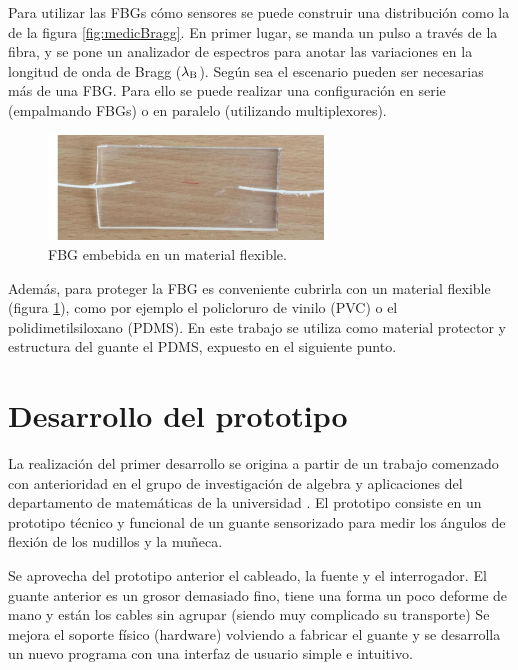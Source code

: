 \begin{itemize}
		Para utilizar las FBGs cómo sensores se puede construir una distribución como la de la figura \ref{fig:medicBragg}. En primer lugar, se manda un pulso a través de la fibra, y se pone un analizador de espectros para anotar las variaciones en la longitud de onda de Bragg ($\lambda\textsubscript{B}$). Según sea el escenario pueden ser necesarias más de una FBG. Para ello se puede realizar una configuración en serie (empalmando FBGs) o en paralelo (utilizando multiplexores). 
		
		\begin{figure}[H]
			\centering
			\includegraphics[width=0.65\textwidth]{./img/flexibleFBG}
			\caption{FBG embebida en un material flexible. \cite{nedomaPDMS}} 
			\label{fig:flexibleFBG}
		\end{figure}
	
		Además, para proteger la FBG es conveniente cubrirla con un material flexible (figura \ref{fig:flexibleFBG}), como por ejemplo el policloruro de vinilo (PVC) o el polidimetilsiloxano (PDMS). En este trabajo se utiliza como material protector y estructura del guante el PDMS, expuesto en el siguiente punto.
	
\end{itemize}


\section{Desarrollo del prototipo}
\label{sec:prototipo3}

La realización del primer desarrollo se origina a partir de un trabajo comenzado con anterioridad en el grupo de investigación de algebra y aplicaciones del departamento de matemáticas de la universidad \cite{SilviaTFM}. 
El prototipo consiste en un prototipo técnico y funcional de un guante sensorizado para medir los ángulos de flexión de los nudillos y la muñeca.

Se aprovecha del prototipo anterior el cableado, la fuente y el interrogador. El guante anterior es un grosor demasiado fino, tiene una forma un poco deforme de mano y están los cables sin agrupar (siendo muy complicado su transporte)
Se mejora el soporte físico (hardware) volviendo a fabricar el guante y se desarrolla un nuevo programa con una interfaz de usuario simple e intuitivo. 


